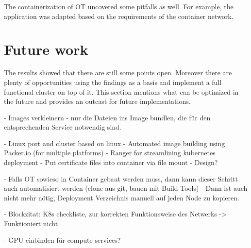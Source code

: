 The containerization of \ac{OT} uncovered some pitfalls as well. For example, the application was adapted based on the requirements of the container network.


\section{Future work}
The results showed that there are still some points open. Moreover there are plenty of opportunities using the findings as a basis and implement a full functional cluster on top of it. This section mentions what can be optimized in the future and provides an outcast for future implementations.


- Images verkleinern - nur die Dateien ins Image bundlen, die für den entsprechenden Service notwendig sind.

- Linux  port and cluster based on linux
- Automated image building using Packer.io (for multiple platforms)
- Ranger for streamlining kubernetes deployment
- Put certificate files into container via file mount - Design?

- Falls OT sowieso in Container gebaut werden muss, dann kann dieser Schritt auch automatisiert werden (clone aus git, bauen mit Build Tools)
- Dann ist auch nicht mehr nötig, Deployment Verzeichnis manuell auf jeden Node zu kopieren.


- Blockzitat: K8s checkliste, zur korrekten Funktionsweise des Netwerks -> Funktioniert nicht

- GPU einbinden für compute services?

